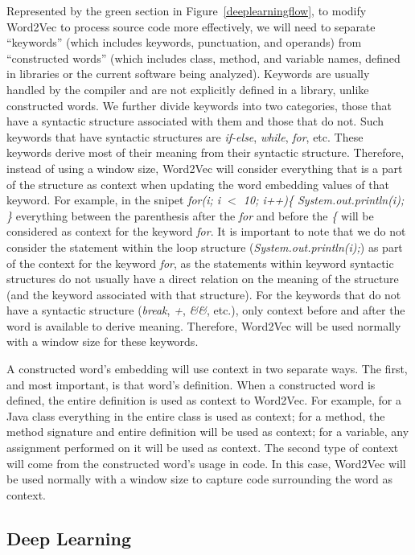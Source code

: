 Represented by the green section in Figure~\ref{deeplearningflow}, to modify Word2Vec to process source code more effectively, we will need to separate ``keywords'' (which includes keywords, punctuation, and operands) from ``constructed words'' (which includes class, method, and variable names, defined in libraries or the current software being analyzed). Keywords are usually handled by the compiler and are not explicitly defined in a library, unlike constructed words. We further divide keywords into two categories, those that have a syntactic structure associated with them and those that do not. Such keywords that have syntactic structures are \textit{if-else}, \textit{while}, \textit{for}, etc. These keywords derive most of their meaning from their syntactic structure. Therefore, instead of using a window size, Word2Vec will consider everything that is a part of the structure as context when updating the word embedding values of that keyword. For example, in the snipet \textit{for(i; i $<$ 10; i++)\{ System.out.println(i); \}} everything between the parenthesis after the \textit{for} and before the \textit{\{} will be considered as context for the keyword \textit{for}. It is important to note that we do not consider the statement within the loop structure (\textit{System.out.println(i);}) as part of the context for the keyword \textit{for}, as the statements within keyword syntactic structures do not usually have a direct relation on the meaning of the structure (and the keyword associated with that structure). For the keywords that do not have a syntactic structure (\textit{break}, \textit{+}, \textit{\&\&}, etc.), only context before and after the word is available to derive meaning. Therefore, Word2Vec will be used normally with a window size for these keywords.

A constructed word's embedding will use context in two separate ways. The first, and most important, is that word's definition. When a constructed word is defined, the entire definition is used as context to Word2Vec. For example, for a Java class everything in the entire class is used as context; for a method, the method signature and entire definition will be used as context; for a variable, any assignment performed on it will be used as context. The second type of context will come from the constructed word's usage in code. In this case, Word2Vec will be used normally with a window size to capture code surrounding the word as context.

\subsection{Deep Learning}

